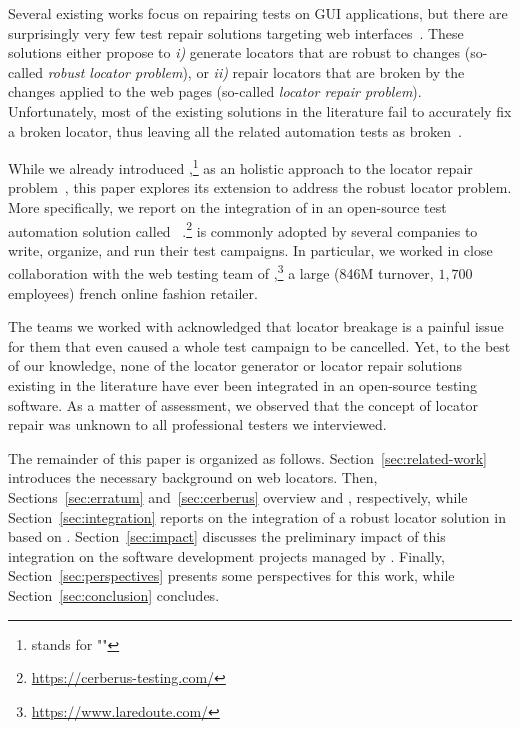 Several existing works focus on repairing tests on GUI applications, but there are surprisingly very few test repair solutions targeting web interfaces~\cite{imtiaz2019systematic}.
These solutions either propose to \emph{i)} generate locators that are robust to changes (so-called \emph{robust locator problem}), or \emph{ii)} repair locators that are broken by the changes applied to the web pages (so-called \emph{locator repair problem}).
Unfortunately, most of the existing solutions in the literature fail to accurately fix a broken locator, thus leaving all the related automation tests as broken~\cite{hammoudi2016record}.

While we already introduced \erratum{},\footnote{\erratum{} stands for "\erratumlong{}"} as an holistic approach to the locator repair problem~\cite{brisset2021erratum}, this paper explores its extension to address the robust locator problem.
More specifically, we report on the integration of \erratum{} in an open-source test automation solution called \cerberus{}~\cite{cerberus-icst20}.\footnote{\url{https://cerberus-testing.com/}}
\cerberus{} is commonly adopted by several companies to write, organize, and run their test campaigns.
In particular, we worked in close collaboration with the web testing team of \laredoute{},\footnote{\url{https://www.laredoute.com/}} a large (846M turnover, $1,700$ employees) french online fashion retailer.

The teams we worked with acknowledged that locator breakage is a painful issue for them that even caused a whole test campaign to be cancelled.
Yet, to the best of our knowledge, none of the locator generator or locator repair solutions existing in the literature have ever been integrated in an open-source testing software.
As a matter of assessment, we observed that the concept of locator repair was unknown to all professional testers we interviewed.


The remainder of this paper is organized as follows.
Section~\ref{sec:related-work} introduces the necessary background on web locators.
% 
Then, Sections~\ref{sec:erratum} and~\ref{sec:cerberus} overview \erratum and \cerberus, respectively, while Section~\ref{sec:integration} reports on the integration of a robust locator solution in \cerberus based on \erratum.
Section~\ref{sec:impact} discusses the preliminary impact of this integration on the software development projects managed by \laredoute.
% 
Finally, Section~\ref{sec:perspectives} presents some perspectives for this work, while Section~\ref{sec:conclusion} concludes.

